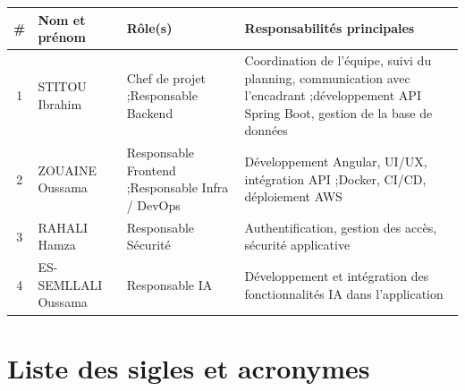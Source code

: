 \begin{table}[ht]
\centering
\small
\begin{tabular}{@{}clp{3.2cm}p{5.8cm}@{}}
\toprule
\# & Nom et prénom & Rôle(s) & Responsabilités principales \\
\midrule
1 & STITOU Ibrahim
  & Chef de projet ;\newline Responsable Backend
  & Coordination de l'équipe, suivi du planning, communication avec l'encadrant ;\newline développement API Spring Boot, gestion de la base de données \\[0.7em]
2 & ZOUAINE Oussama
  & Responsable Frontend ;\newline Responsable Infra / DevOps
  & Développement Angular, UI/UX, intégration API ;\newline Docker, CI/CD, déploiement AWS \\[0.7em]
3 & RAHALI Hamza
  & Responsable Sécurité
  & Authentification, gestion des accès, sécurité applicative \\[0.7em]
4 & ES-SEMLLALI Oussama
  & Responsable IA
  & Développement et intégration des fonctionnalités IA dans l'application \\
\bottomrule
\end{tabular}
\end{table}

\clearpage
\chapter*{Liste des sigles et acronymes}

